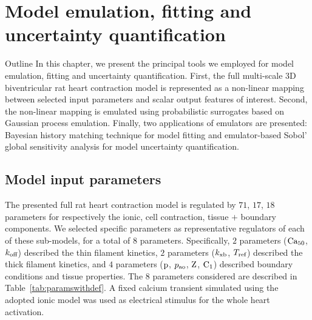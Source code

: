 \chapter{Model emulation, fitting and uncertainty 
quantification}\label{cha:chapter3}
%
%
%
\begin{remark}{Outline}
    In this chapter, we present the principal tools we employed for model emulation, fitting and uncertainty quantification. First, the full multi-scale $3$D biventricular rat heart contraction model is represented as a non-linear mapping between selected input parameters and scalar output features of interest. Second, the non-linear mapping is emulated using probabilistic surrogates based on Gaussian process emulation. Finally, two applications of emulators are presented: Bayesian history matching technique for model fitting and emulator-based Sobol' global sensitivity analysis for model uncertainty quantification. 
\end{remark}


%
%
%
\section{Model input parameters}
The presented full rat heart contraction model is regulated by $71$, $17$, $18$ parameters for respectively the ionic, cell contraction, tissue $+$ boundary components. We selected specific parameters as representative regulators of each of these sub-models, for a total of $8$ parameters. Specifically, $2$ parameters ($\textrm{Ca}_{50}$, $k_{\textrm{off}}$) described the thin filament kinetics, $2$ parameters ($k_{\textrm{xb}}$, $T_{\textrm{ref}}$) described the thick filament kinetics, and $4$ parameters ($\textrm{p}$, $p_{\textrm{ao}}$, $\textrm{Z}$, $\textrm{C}_1$) described boundary conditions and tissue properties. The $8$ parameters considered are described in Table~\ref{tab:paramswithdef}. A fixed calcium transient simulated using the adopted ionic model was used as electrical stimulus for the whole heart activation.

